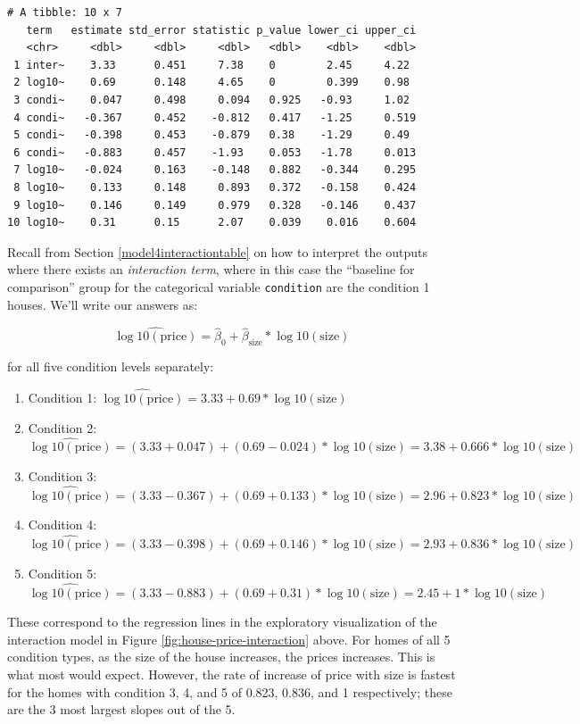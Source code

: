 \documentclass[12pt,]{krantz}
\providecommand{\tightlist}{%
  \setlength{\itemsep}{0pt}\setlength{\parskip}{0pt}}
\begin{document}
\begin{verbatim}
# A tibble: 10 x 7
   term   estimate std_error statistic p_value lower_ci upper_ci
   <chr>     <dbl>     <dbl>     <dbl>   <dbl>    <dbl>    <dbl>
 1 inter~    3.33      0.451     7.38    0        2.45     4.22 
 2 log10~    0.69      0.148     4.65    0        0.399    0.98 
 3 condi~    0.047     0.498     0.094   0.925   -0.93     1.02 
 4 condi~   -0.367     0.452    -0.812   0.417   -1.25     0.519
 5 condi~   -0.398     0.453    -0.879   0.38    -1.29     0.49 
 6 condi~   -0.883     0.457    -1.93    0.053   -1.78     0.013
 7 log10~   -0.024     0.163    -0.148   0.882   -0.344    0.295
 8 log10~    0.133     0.148     0.893   0.372   -0.158    0.424
 9 log10~    0.146     0.149     0.979   0.328   -0.146    0.437
10 log10~    0.31      0.15      2.07    0.039    0.016    0.604
\end{verbatim}

Recall from Section \ref{model4interactiontable} on how to interpret the
outputs where there exists an \emph{interaction term}, where in this
case the ``baseline for comparison'' group for the categorical variable
\texttt{condition} are the condition 1 houses. We'll write our answers
as:

\[\widehat{\log10(\text{price})} = \hat{\beta}_0 + \hat{\beta}_{\text{size}} * \log10(\text{size})\]

for all five condition levels separately:

\begin{enumerate}
\def\labelenumi{\arabic{enumi}.}
\tightlist
\item
  Condition 1:
  \(\widehat{\log10(\text{price})} = 3.33 + 0.69 * \log10(\text{size})\)
\item
  Condition 2:
  \(\widehat{\log10(\text{price})} = (3.33 + 0.047) + (0.69 - 0.024) * \log10(\text{size}) = 3.38 + 0.666 * \log10(\text{size})\)
\item
  Condition 3:
  \(\widehat{\log10(\text{price})} = (3.33 - 0.367) + (0.69 + 0.133) * \log10(\text{size}) = 2.96 + 0.823 * \log10(\text{size})\)
\item
  Condition 4:
  \(\widehat{\log10(\text{price})} = (3.33 - 0.398) + (0.69 + 0.146) * \log10(\text{size}) = 2.93 + 0.836 * \log10(\text{size})\)
\item
  Condition 5:
  \(\widehat{\log10(\text{price})} = (3.33 - 0.883) + (0.69 + 0.31) * \log10(\text{size}) = 2.45 + 1 * \log10(\text{size})\)
\end{enumerate}

These correspond to the regression lines in the exploratory
visualization of the interaction model in Figure
\ref{fig:house-price-interaction} above. For homes of all 5 condition
types, as the size of the house increases, the prices increases. This is
what most would expect. However, the rate of increase of price with size
is fastest for the homes with condition 3, 4, and 5 of 0.823, 0.836, and
1 respectively; these are the 3 most largest slopes out of the 5.
\end{document}

